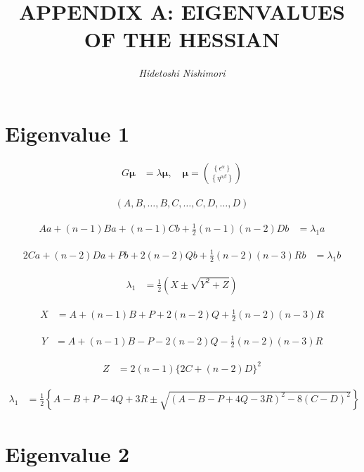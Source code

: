 \documentclass{article}
\title{\LARGE\scshape\MakeUppercase{Appendix A: Eigenvalues of the Hessian}}
\author{\textit{Hidetoshi Nishimori}}
\date{}
\begin{document}
\maketitle

\section{Eigenvalue 1}

\begin{align*}
G \boldsymbol{\mu} &= \lambda \boldsymbol{\mu}, \quad \boldsymbol{\mu} = \binom{\left\{\epsilon^{\alpha}\right\}}{\left\{\eta^{\alpha \beta}\right\}} 
\tag{A.1}
\end{align*}

\begin{align*}
(A, B, \ldots, B, C, \ldots, C, D, \ldots, D)
\tag{A.2}
\end{align*}

\begin{align*}
A a + (n-1) B a + (n-1) C b + \frac{1}{2}(n-1)(n-2) D b &= \lambda_1 a 
\tag{A.3}
\end{align*}

\begin{align*}
2 C a + (n-2) D a + P b + 2(n-2) Q b + \frac{1}{2}(n-2)(n-3) R b &= \lambda_1 b 
\tag{A.4}
\end{align*}

\begin{align*}
\lambda_1 &= \frac{1}{2}\left(X \pm \sqrt{Y^2 + Z}\right)
\tag{A.5}
\end{align*}

\begin{align*}
X &= A + (n-1) B + P + 2(n-2) Q + \frac{1}{2}(n-2)(n-3) R
\tag{A.6}
\end{align*}

\begin{align*}
Y &= A + (n-1) B - P - 2(n-2) Q - \frac{1}{2}(n-2)(n-3) R
\tag{A.7}
\end{align*}

\begin{align*}
Z &= 2(n-1)\{2 C + (n-2) D\}^2
\tag{A.8}
\end{align*}

\begin{align*}
\lambda_1 &= \frac{1}{2}\left\{A - B + P - 4 Q + 3 R \pm \sqrt{(A-B-P+4Q-3R)^2 - 8(C-D)^2}\right\} 
\tag{A.9}
\end{align*}

\section{Eigenvalue 2}
\end{document}
